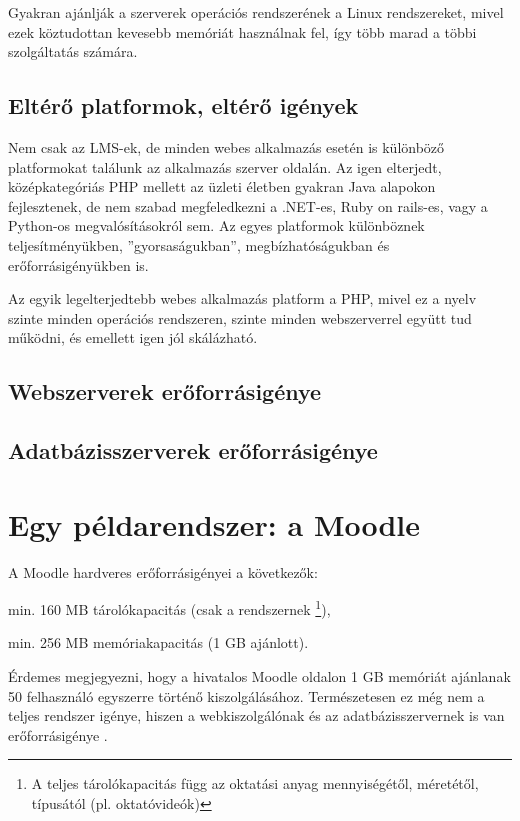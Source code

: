 Gyakran ajánlják a szerverek operációs rendszerének a Linux rendszereket, mivel ezek köztudottan kevesebb memóriát használnak fel, így több marad a többi szolgáltatás számára. 

\subsection{Eltérő platformok, eltérő igények}
Nem csak az LMS-ek, de minden webes alkalmazás esetén is különböző platformokat találunk az alkalmazás szerver oldalán. Az igen elterjedt, középkategóriás PHP mellett az üzleti életben gyakran Java alapokon fejlesztenek, de nem szabad megfeledkezni a .NET-es, Ruby on rails-es, vagy a Python-os megvalósításokról sem. Az egyes platformok különböznek teljesítményükben, ''gyorsaságukban'', megbízhatóságukban és erőforrásigényükben is.

Az egyik legelterjedtebb webes alkalmazás platform a PHP, mivel ez a nyelv szinte minden operációs rendszeren, szinte minden webszerverrel együtt tud működni, és emellett igen jól skálázható.

\subsection{Webszerverek erőforrásigénye}


\subsection{Adatbázisszerverek erőforrásigénye}


\section{Egy példarendszer: a Moodle}
A Moodle hardveres erőforrásigényei a következők:
\begin{sajat_itemize}
\item min. 160 MB tárolókapacitás (csak a rendszernek \footnote{A teljes tárolókapacitás függ az oktatási anyag mennyiségétől, méretétől, típusától (pl. oktatóvideók)}),
\item min. 256 MB memóriakapacitás (1 GB ajánlott).
\end{sajat_itemize}
Érdemes megjegyezni, hogy a hivatalos Moodle oldalon 1 GB memóriát ajánlanak 50 felhasználó egyszerre történő kiszolgálásához.
Természetesen ez még nem a teljes rendszer igénye, hiszen a webkiszolgálónak és az adatbázisszervernek is van erőforrásigénye \cite{moodleinst}.

